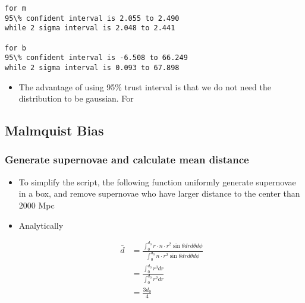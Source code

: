 \documentclass{article}
\newlength{\cellleftmargin}
\newlength{\smallerfontscale}
\def\smaller{\fontsize{\smallerfontscale}{\smallerfontscale}\selectfont}
\begin{document}
\par\vspace{1\smallerfontscale}%
    \begin{addmargin}[\cellleftmargin]{0em}%
    {\smaller%
    \vspace{-1\smallerfontscale}%
    
    \begin{Verbatim}[commandchars=\\\{\}]
for m
95\% confident interval is 2.055 to 2.490
while 2 sigma interval is 2.048 to 2.441

for b
95\% confident interval is -6.508 to 66.249
while 2 sigma interval is 0.093 to 67.898
    \end{Verbatim}
}%
    \end{addmargin}%
    \begin{itemize}
\itemsep1pt\parskip0pt
\item
  The advantage of using 95\% trust interval is that we do not need the
  distribution to be gaussian. For
\end{itemize}

    \subsection{Malmquist Bias}\label{malmquist-bias}

    \subsubsection{Generate supernovae and calculate mean
distance}\label{generate-supernovae-and-calculate-mean-distance}

\begin{itemize}
\itemsep1pt\parskip0pt
\item
  To simplify the script, the following function uniformly generate
  supernovae in a box, and remove supernovae who have larger distance to
  the center than 2000 Mpc
\item
  Analytically

  \begin{equation}
  \begin{split}
  \bar{d} & = \frac{\int_0^{d_0} r\cdot n\cdot r^2 \sin\theta drd\theta d\phi}{\int_0^{d_0}n\cdot r^2 \sin\theta drd\theta d\phi}\\
  & = \frac{\int_0^{d_0} r^3dr}{\int_0^{d_0} r^2dr}\\
  & = \frac{3d_0}{4}
  \end{split}
  \end{equation}
\end{itemize}
\end{document}
